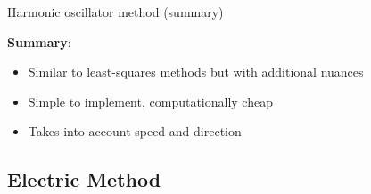 \documentclass[aspectratio=169, bigfiles, professionalfonts, hyperref={colorlinks=true, allcolors=., urlcolor=blue}]{beamer}
\begin{document}
\begin{frame}{Harmonic oscillator method (summary)}
    \begin{tcolorbox}[colframe=yellow,
    colback=yellow!10!white,
    colbacktitle=yellow!40!white,
    coltitle=black, fonttitle=\bfseries]
    \textbf{Summary}:
    \begin{itemize}
	\item Similar to least-squares methods but with additional nuances
        \item
        Simple to implement, computationally cheap
        \item
        Takes into account speed and direction
    \end{itemize}
    
\end{tcolorbox}
\end{frame}



\subsection{Electric Method}
\end{document}
